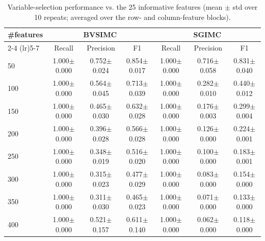 \begin{table}[t]
\centering
\caption{Variable-selection performance vs. the 25 informative features (mean $\pm$ std over 10 repeats; averaged over the row- and column-feature blocks).}
\label{tab:selection}
\begin{tabular}{lcccccc}
\toprule
\#features & \multicolumn{3}{c}{BVSIMC} & \multicolumn{3}{c}{SGIMC} \\
\cmidrule(lr){2-4} \cmidrule(lr){5-7}
 & Recall & Precision & F1 & Recall & Precision & F1 \\
\midrule
50 & 1.000$\pm$0.000 & 0.752$\pm$0.024 & 0.854$\pm$0.017 & 1.000$\pm$0.000 & 0.716$\pm$0.058 & 0.831$\pm$0.040 \\
100 & 1.000$\pm$0.000 & 0.564$\pm$0.045 & 0.713$\pm$0.039 & 1.000$\pm$0.000 & 0.282$\pm$0.010 & 0.440$\pm$0.012 \\
150 & 1.000$\pm$0.000 & 0.465$\pm$0.030 & 0.632$\pm$0.028 & 1.000$\pm$0.000 & 0.176$\pm$0.003 & 0.299$\pm$0.004 \\
200 & 1.000$\pm$0.000 & 0.396$\pm$0.028 & 0.566$\pm$0.028 & 1.000$\pm$0.000 & 0.126$\pm$0.000 & 0.224$\pm$0.001 \\
250 & 1.000$\pm$0.000 & 0.348$\pm$0.019 & 0.516$\pm$0.020 & 1.000$\pm$0.000 & 0.100$\pm$0.000 & 0.183$\pm$0.001 \\
300 & 1.000$\pm$0.000 & 0.315$\pm$0.023 & 0.477$\pm$0.029 & 1.000$\pm$0.000 & 0.083$\pm$0.000 & 0.154$\pm$0.000 \\
350 & 1.000$\pm$0.000 & 0.311$\pm$0.030 & 0.465$\pm$0.023 & 1.000$\pm$0.000 & 0.071$\pm$0.000 & 0.133$\pm$0.000 \\
400 & 1.000$\pm$0.000 & 0.521$\pm$0.157 & 0.611$\pm$0.140 & 1.000$\pm$0.000 & 0.062$\pm$0.000 & 0.118$\pm$0.000 \\
\bottomrule
\end{tabular}
\end{table}
